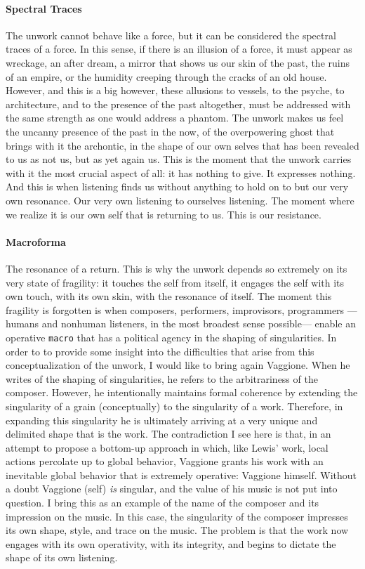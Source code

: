 \paragraph{Spectral Traces}
The unwork cannot behave like a force, but it can be considered the spectral traces of a force. In this sense, if there is an illusion of a force, it must appear as wreckage, an after dream, a mirror that shows us our skin of the past, the ruins of an empire, or the humidity creeping through the cracks of an old house. However, and this is a big however, these allusions to vessels, to the psyche, to architecture, and to the presence of the past altogether, must be addressed with the same strength as one would address a phantom. The unwork makes us feel the uncanny presence of the past in the now, of the overpowering ghost that brings with it the archontic, in the shape of our own selves that has been revealed to us as not us, but as yet again us. This is the moment that the unwork carries with it the most crucial aspect of all: it has nothing to give. It expresses nothing. And this is when listening finds us without anything to hold on to but our very own resonance. Our very own listening to ourselves listening. The moment where we realize it is our own self that is returning to us. This is our resistance.

\paragraph{Macroforma}
The resonance of a return. This is why the unwork depends so extremely on its very state of fragility: it touches the self from itself, it engages the self with its own touch, with its own skin, with the resonance of itself. The moment this fragility is forgotten is when composers, performers, improvisors, programmers ---humans and nonhuman listeners, in the most broadest sense possible--- enable an operative \texttt{macro} that has a political agency in the shaping of singularities. In order to to provide some insight into the difficulties that arise from this conceptualization of the unwork, I would like to bring again Vaggione. When he writes of the shaping of singularities, he refers to the arbitrariness of the composer. However, he intentionally maintains formal coherence by extending the singularity of a grain (conceptually) to the singularity of a work. Therefore, in expanding this singularity he is ultimately arriving at a very unique and delimited shape that is the work. The contradiction I see here is that, in an attempt to propose a bottom-up approach in which, like Lewis' work, local actions percolate up to global behavior, Vaggione grants his work with an inevitable global behavior that is extremely operative: Vaggione himself. Without a doubt Vaggione (self) \textit{is} singular, and the value of his music is not put into question. I bring this as an example of the name of the composer and its impression on the music. In this case, the singularity of the composer impresses its own shape, style, and trace on the music. The problem is that the work now engages with its own operativity, with its integrity, and begins to dictate the shape of its own listening.

